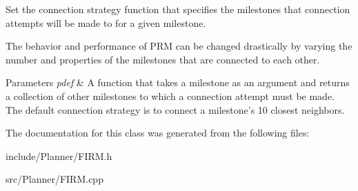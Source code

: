 \-Set the connection strategy function that specifies the milestones that connection attempts will be made to for a given milestone. 

\begin{DoxyParagraph}{\-The behavior and performance of \-P\-R\-M can be changed drastically}
by varying the number and properties of the milestones that are connected to each other.
\end{DoxyParagraph}

\begin{DoxyParams}{\-Parameters}
{\em pdef} & \-A function that takes a milestone as an argument and returns a collection of other milestones to which a connection attempt must be made. \-The default connection strategy is to connect a milestone's 10 closest neighbors. \\
\hline
\end{DoxyParams}


\-The documentation for this class was generated from the following files\-:\begin{DoxyCompactItemize}
\item 
include/\-Planner/\-F\-I\-R\-M.\-h\item 
src/\-Planner/\-F\-I\-R\-M.\-cpp\end{DoxyCompactItemize}
